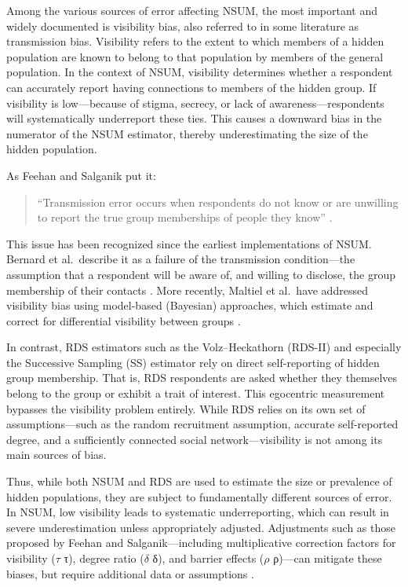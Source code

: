 \documentclass[
  12pt,
  letterpaper,
  DIV=11,
  numbers=noendperiod]{scrartcl}
\theoremstyle{plain}
\theoremstyle{definition}
\begin{document}
Among the various sources of error affecting NSUM, the most important
and widely documented is visibility bias, also referred to in some
literature as transmission bias. Visibility refers to the extent to
which members of a hidden population are known to belong to that
population by members of the general population. In the context of NSUM,
visibility determines whether a respondent can accurately report having
connections to members of the hidden group. If visibility is
low---because of stigma, secrecy, or lack of awareness---respondents
will systematically underreport these ties. This causes a downward bias
in the numerator of the NSUM estimator, thereby underestimating the size
of the hidden population.

As Feehan and Salganik put it:

\begin{quote}
``Transmission error occurs when respondents do not know or are
unwilling to report the true group memberships of people they know''
\autocite[155]{feeh16-generalizing}.
\end{quote}

This issue has been recognized since the earliest implementations of
NSUM. Bernard et al.~describe it as a failure of the transmission
condition---the assumption that a respondent will be aware of, and
willing to disclose, the group membership of their contacts
\autocite{bern10-counting}. More recently, Maltiel et al.~have addressed
visibility bias using model-based (Bayesian) approaches, which estimate
and correct for differential visibility between groups
\autocite{malt15-estimating}.

In contrast, RDS estimators such as the Volz--Heckathorn (RDS-II) and
especially the Successive Sampling (SS) estimator rely on direct
self-reporting of hidden group membership. That is, RDS respondents are
asked whether they themselves belong to the group or exhibit a trait of
interest. This egocentric measurement bypasses the visibility problem
entirely. While RDS relies on its own set of assumptions---such as the
random recruitment assumption, accurate self-reported degree, and a
sufficiently connected social network---visibility is not among its main
sources of bias.

Thus, while both NSUM and RDS are used to estimate the size or
prevalence of hidden populations, they are subject to fundamentally
different sources of error. In NSUM, low visibility leads to systematic
underreporting, which can result in severe underestimation unless
appropriately adjusted. Adjustments such as those proposed by Feehan and
Salganik---including multiplicative correction factors for visibility
(\(\tau\) τ), degree ratio (\(\delta\) δ), and barrier effects (\(\rho\)
ρ)---can mitigate these biases, but require additional data or
assumptions \autocite{feeh16-generalizing}.
\end{document}
